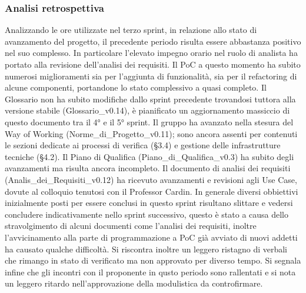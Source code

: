 \newpage
\subsubsection{Analisi retrospettiva}
Analizzando le ore utilizzate nel terzo sprint, in relazione allo stato di avanzamento del progetto, il precedente periodo risulta essere abbastanza positivo nel suo complesso. In particolare l'elevato impegno orario nel ruolo di analista ha portato alla revisione dell'analisi dei requisiti. Il PoC a questo momento ha subito numerosi miglioramenti sia per l'aggiunta di funzionalità, sia per il refactoring di alcune componenti, portandone lo stato complessivo a quasi completo. Il Glossario non ha subito modifiche dallo sprint precedente trovandosi tuttora alla versione stabile (Glossario\_v0.14), è pianificato un aggiornamento massiccio di questo documento tra il 4° e il 5° sprint. Il
gruppo ha avanzato nella stesura del Way of Working (Norme\_di\_Progetto\_v0.11);
sono ancora assenti per contenuti le sezioni dedicate ai processi di verifica (§3.4) e gestione delle infrastrutture tecniche (§4.2). Il Piano di Qualifica (Piano\_di\_Qualifica\_v0.3) ha subito degli avanzamenti ma risulta ancora incompleto. Il documento di analisi dei requisiti (Analis\_dei\_Requisiti\_v0.12) ha ricevuto avanzamenti e revisioni agli Use Case, dovute al colloquio tenutosi con il Professor Cardin. In generale diversi obbiettivi inizialmente posti per essere conclusi in questo sprint risultano slittare e vedersi concludere indicativamente nello sprint successivo, questo è stato a causa dello stravolgimento di alcuni documenti come l'analisi dei requisiti, inoltre l'avvicinamento alla parte di programmazione a PoC già avviato di nuovi addetti ha causato qualche difficoltà. Si riscontra inoltre un leggero ristagno di verbali che rimango in stato di verificato ma non approvato per diverso tempo. Si segnala infine che gli incontri con il proponente in qusto periodo sono rallentati e si nota un leggero ritardo nell'approvazione della modulistica da controfirmare.
\newpage